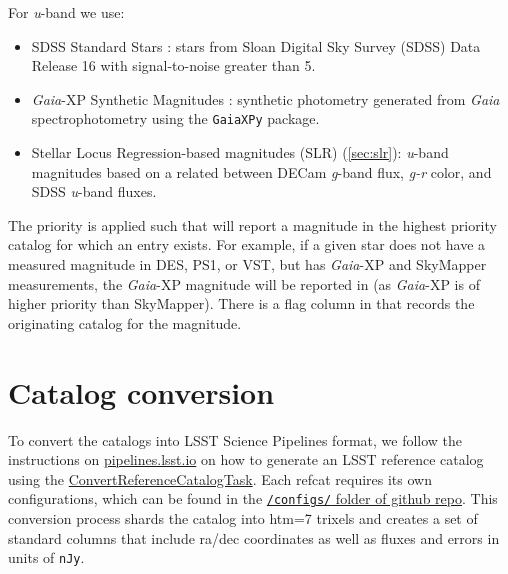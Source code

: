 For \textit{u}-band we use:
\begin{itemize}
    \item SDSS Standard Stars \citep[Section \ref{sec:sdss};][]{Ahumada:2020}: stars from Sloan Digital Sky Survey (SDSS) Data Release 16 with signal-to-noise greater than 5.
    \item \emph{Gaia}-XP Synthetic Magnitudes \citep[Section \ref{sec:gaiaxp}][]{GaiaCollaboration:2023-XP}: synthetic photometry generated from \emph{Gaia} spectrophotometry using the \texttt{GaiaXPy} package.
    \item Stellar Locus Regression-based magnitudes (SLR) (\ref{sec:slr}): \textit{u}-band magnitudes based on a related between DECam \textit{g}-band flux, \textit{g-r} color, and SDSS \textit{u}-band fluxes.
\end{itemize}

The priority is applied such that \monster will report a magnitude in the highest priority catalog for which an entry exists. For example, if a given star does not have a measured magnitude in DES, PS1, or VST, but has \emph{Gaia}-XP and SkyMapper measurements, the \emph{Gaia}-XP magnitude will be reported in \monster (as \emph{Gaia}-XP is of higher priority than SkyMapper). There is a flag column in \monster that records the originating catalog for the magnitude.

\section{Catalog conversion}
\label{sec:conversion}
To convert the catalogs into LSST Science Pipelines format, we follow the instructions on \href{https://pipelines.lsst.io/modules/lsst.meas.algorithms/creating-a-reference-catalog.html}{pipelines.lsst.io} on how to generate an LSST reference catalog using the \href{https://pipelines.lsst.io/modules/lsst.meas.algorithms/tasks/lsst.meas.algorithms.ConvertReferenceCatalogTask.html#lsst-task-lsst-meas-algorithms-convertreferencecatalog-convertreferencecatalogtask}{ConvertReferenceCatalogTask}. Each refcat requires its own configurations, which can be found in the \href{https://github.com/lsst-dm/the_monster/tree/main/configs}{\texttt{/configs/} folder of \monster github repo}.
This conversion process shards the catalog into htm=7 trixels and creates a set of standard columns that include ra/dec coordinates as well as fluxes and errors in units of \texttt{nJy}.

